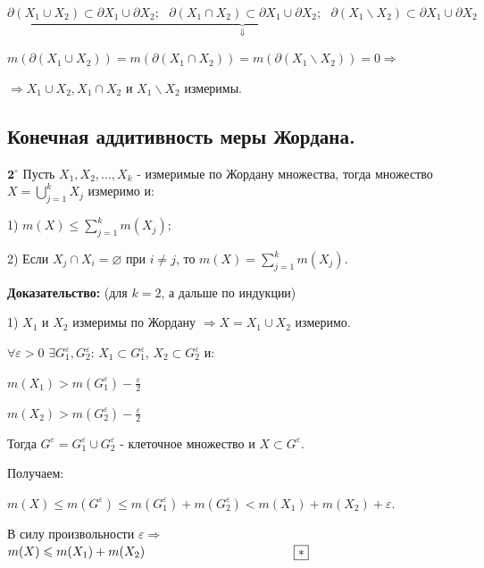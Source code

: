 \documentclass[a4paper,12pt]{article} %
\begin{document}
\noindent $\underbrace{\partial (X_1 \cup X_2) \subset \partial X_1 \cup \partial X_2;\text{ } \partial (X_1 \cap X_2) \subset \partial X_1 \cup \partial X_2;\text{ } \partial (X_1 \backslash X_2) \subset \partial X_1 \cup \partial X_2}_{\Downarrow}$	

$m(\partial (X_1 \cup X_2)) = m(\partial (X_1 \cap X_2)) = m(\partial (X_1 \backslash X_2)) = 0 \Rightarrow$

\vspace{2mm}
\noindent $\Rightarrow X_1 \cup X_2, X_1 \cap X_2$ и $ X_1 \backslash X_2$ измеримы.\\


\subsection{Конечная аддитивность меры Жордана.}

$\textbf{2}^\circ$ Пусть $X_1, X_2, \ldots, X_k$ - измеримые по Жордану множества, тогда множество $X = \bigcup\limits_{j = 1}^k X_j$ измеримо и:

1) $m(X) \leqslant \sum\limits_{j = 1}^k m(X_j)$;

2) Если $X_j \cap X_i = \varnothing$ при $i \neq j$, то $m(X) = \sum\limits_{j = 1}^k m(X_j)$.

\textbf{Доказательство:} (для $k = 2$, а дальше по индукции)

\vspace{2mm}

1) $X_1$ и $X_2$ измеримы по Жордану $\Rightarrow X = X_1 \cup X_2$ измеримо.

$\forall \varepsilon > 0$ $\exists G_1^{\varepsilon}, G_2^{\varepsilon}$: $X_1 \subset G_1^{\varepsilon}$, $X_2 \subset G_2^{\varepsilon}$ и: 

$m(X_1) > m(G_1^{\varepsilon}) - \frac{\varepsilon}{2}$

$m(X_2) > m(G_2^{\varepsilon}) - \frac{\varepsilon}{2}$

\vspace{2mm}

Тогда $G^{\varepsilon} = G_1^{\varepsilon} \cup G_2^{\varepsilon}$ - клеточное множество и $X \subset G^{\varepsilon}$.

Получаем:

$m(X) \leqslant m(G^{\varepsilon}) \leqslant m(G_1^{\varepsilon}) + m(G_2^{\varepsilon}) < m(X_1) + m(X_2) + \varepsilon$.

\vspace{2mm}

В силу произвольности $\varepsilon \Rightarrow$ $m(X) \leqslant m(X_1) + m(X_2) \hspace{42mm} \boxed{*}$
\end{document}
